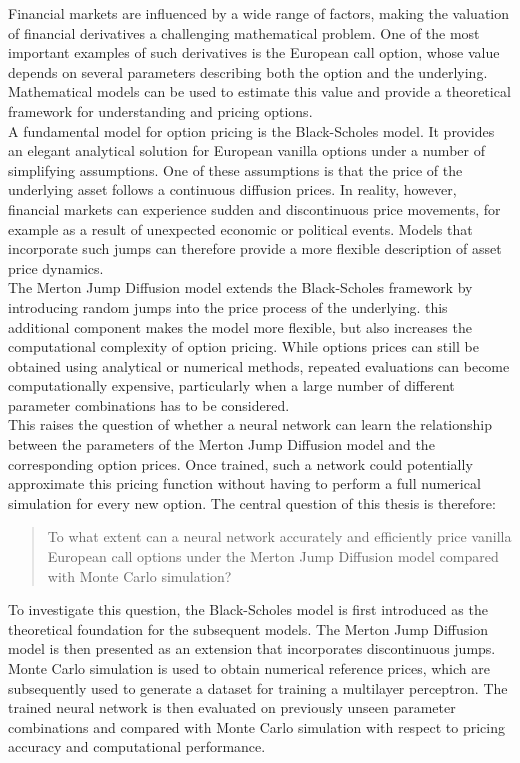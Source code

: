 \documentclass{article}
\begin{document}
	Financial markets are influenced by a wide range of factors, making the valuation of financial derivatives a challenging mathematical problem. One of the most important examples of such derivatives is the European call option, whose value depends on several parameters describing both the option and the underlying. Mathematical models can be used to estimate this value and provide a theoretical framework for understanding and pricing options.\\A fundamental model for option pricing is the Black-Scholes model. It provides an elegant analytical solution for European vanilla options under a number of simplifying assumptions. One of these assumptions is that the price of the underlying asset follows a continuous diffusion prices. In reality, however, financial markets can experience sudden and discontinuous price movements, for example as a result of unexpected economic or political events. Models that incorporate such jumps can therefore provide a more flexible description of asset price dynamics.\\The Merton Jump Diffusion model extends the Black-Scholes framework by introducing random jumps into the price process of the underlying. this additional component makes the model more flexible, but also increases the computational complexity of option pricing. While options prices can still be obtained using analytical or numerical methods, repeated evaluations can become computationally expensive, particularly when a large number of different parameter combinations has to be considered.\\This raises the question of whether a neural network can learn the relationship between the parameters of the Merton Jump Diffusion model and the corresponding option prices. Once trained, such a network could potentially approximate this pricing function without having to perform a full numerical simulation for every new option. The central question of this thesis is therefore:\begin{quote} To what extent can a neural network accurately and efficiently price vanilla European call options under the Merton Jump Diffusion model compared with Monte Carlo simulation?\end{quote}To investigate this question, the Black-Scholes model is first introduced as the theoretical foundation for the subsequent models. The Merton Jump Diffusion model is then presented as an extension that incorporates discontinuous jumps. Monte Carlo simulation is used to obtain numerical reference prices, which are subsequently used to generate a dataset for training a multilayer perceptron. The trained neural network is then evaluated on previously unseen parameter combinations and compared with Monte Carlo simulation with respect to pricing accuracy and computational performance.
	
\end{document}
